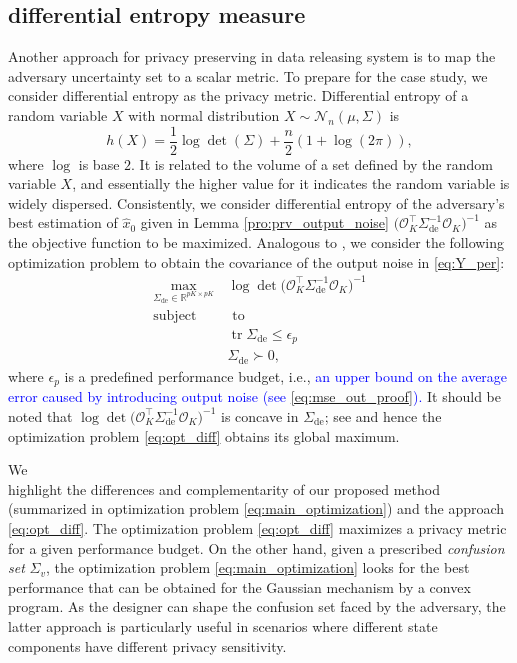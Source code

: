 \documentclass{ifacconf}
\DeclareMathOperator{\tr}{tr}
\newcommand{\calN}{\ensuremath{\mathcal{N}}}
\newcommand{\calO}{\ensuremath{\mathcal{O}}}
\newcommand{\R}{\ensuremath{\mathbb R}}
\def\be{\begin{equation}}
\def\ee{\end{equation}}
\newcommand{\+}{\mathsmaller{+}}
\newcommand{\blue}[1]{\textcolor{blue}{#1}}
\begin{document}
\subsection{differential entropy measure}
Another approach for privacy preserving in data releasing system is to map the adversary uncertainty set to a scalar metric. To prepare for the case study, we consider differential entropy as the privacy metric. %
 Differential entropy of a random variable $X$ with normal distribution $X\sim\calN_n(\mu, \Sigma)$ is \cite[p. 250]{thomas2006elements}
\[
h(X) = \frac{1}{2}\log\det(\Sigma)+\frac{n}{2}(1+\log(2\pi)),
\]
where $\log$ is base $2$. It is related to the volume of a set defined by the random variable $X$, and essentially the higher value for it indicates the random variable is widely dispersed.  
Consistently, we consider differential entropy of the adversary's best estimation of $\hat{x}_0$ given in Lemma \ref{pro:prv_output_noise} $\big(\calO_K^ \top \Sigma_{\text{de}}^{-1} \calO_K \big)^{-1}$ as the objective function to be maximized. Analogous to \cite{hayati2021finite}, we consider the following optimization problem to obtain the covariance of the output noise in \eqref{eq:Y_per}:
\be\label{eq:opt_diff}
\begin{aligned}
	\max_{\Sigma_{\text{de}} \in \R^{pK \times pK}}  \,& \log\det\big(\calO_K^ \top \Sigma_{\text{de}}^{-1} \calO_K \big)^{-1}  \\
		\text{sub}\text{ject}& \,\, \text{to}  \\
	&\tr\Sigma_{\text{de}} \leq \epsilon_{p}\\
	&\Sigma_{\text{de}} \succ 0,
\end{aligned}
\ee
where $\epsilon_{p}$ is a predefined performance budget, i.e., \blue{an upper bound on the average error caused by introducing output noise (see \eqref{eq:mse_out_proof}).} 
It should be noted that $\log\det\big(\calO_K^ \top \Sigma_{\text{de}}^{-1} \calO_K \big)^{-1}$ is concave in $\Sigma_{\text{de}}$; see \cite[Proposition 10.6.17]{bernstein2018scalar} and hence the optimization problem \eqref{eq:opt_diff} obtains its global maximum. 
\begin{rem}\label{rem:compare_methods}
	We \\highlight the differences and complementarity  of our proposed method (summarized in optimization problem \eqref{eq:main_optimization}) and the approach \eqref{eq:opt_diff}. 
 The optimization problem \eqref{eq:opt_diff} maximizes a privacy metric for a given performance budget. 
 On the other hand, given a prescribed  \textit{confusion set} $\Sigma_v$, the optimization problem \eqref{eq:main_optimization} looks for the best performance that can be obtained for the Gaussian mechanism by a convex program. 
%
As the designer can shape the confusion set faced by the adversary, the latter approach is particularly useful in scenarios where different state components have different privacy sensitivity.  
%
\end{rem}
\end{document}
